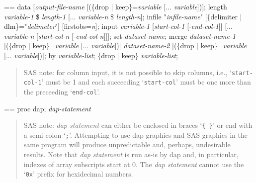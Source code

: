 \documentclass{book}
\makeatletter
\newcommand\Texinfocommandstyletextvar[1]{{\normalfont{}\textsl{#1}}}%
\newenvironment{Texinfopreformatted}{%
  \par\GNUTobeylines\obeyspaces\frenchspacing\parskip=\z@\parindent=\z@}{}
{\catcode`\^^M=13 \gdef\GNUTobeylines{\catcode`\^^M=13 \def^^M{\null\par}}}
\newenvironment{Texinfoindented}{\begin{list}{}{}\item\relax}{\end{list}}
\renewcommand{\_}{\Texinfounderscore\discretionary{}{}{}}
\makeatother
\begin{document}
\begin{Texinfoindented}
\begin{Texinfopreformatted}%
data [\Texinfocommandstyletextvar{output-file-name} [(\{drop | keep\}=\Texinfocommandstyletextvar{variable} [... \Texinfocommandstyletextvar{variable}])];
length \Texinfocommandstyletextvar{variable-1} \$ \Texinfocommandstyletextvar{length-1} [... \Texinfocommandstyletextvar{variable-n} \$ \Texinfocommandstyletextvar{length-n}];
infile "\Texinfocommandstyletextvar{infile-name}" [\{delimiter | dlm\}="\Texinfocommandstyletextvar{delimeter}"]
                       [firstobs=\Texinfocommandstyletextvar{n}];
input \Texinfocommandstyletextvar{variable-1} [\Texinfocommandstyletextvar{start-col-1} [-\Texinfocommandstyletextvar{end-col-1}]]
      [... \Texinfocommandstyletextvar{variable-n} [\Texinfocommandstyletextvar{start-col-n} [-\Texinfocommandstyletextvar{end-col-n}]]];
set \Texinfocommandstyletextvar{dataset-name};
merge \Texinfocommandstyletextvar{dataset-name-1} [(\{drop | keep\}=\Texinfocommandstyletextvar{variable} [... \Texinfocommandstyletextvar{variable}])]
     \Texinfocommandstyletextvar{dataset-name-2} [(\{drop | keep\}=\Texinfocommandstyletextvar{variable} [... \Texinfocommandstyletextvar{variable}])];
by \Texinfocommandstyletextvar{variable-list};
\{drop | keep\} \Texinfocommandstyletextvar{variable-list};

\end{Texinfopreformatted}
\end{Texinfoindented}

\begin{quote}
SAS note: for column input, it is not possible to skip columns, i.e.,
`\texttt{start-col-1}' must be 1 and each succeeding `\texttt{start-col}'
must be one more than the preceeding `\texttt{end-col}'.
\end{quote}

\begin{Texinfoindented}
\begin{Texinfopreformatted}%
proc dap;
\Texinfocommandstyletextvar{dap-statement}

\end{Texinfopreformatted}
\end{Texinfoindented}

\begin{quote}
SAS note: \Texinfocommandstyletextvar{dap statement} can either be enclosed in braces `\texttt{\{\ \}}' or
end with a semi-colon `\texttt{;}'. Attempting to use dap graphics and SAS graphics in the
same program will produce unpredictable and, perhaps, undesirable results. Note
that \Texinfocommandstyletextvar{dap statement} is run as-is by dap and, in particular, indexes of array
subscripts start at 0. The \Texinfocommandstyletextvar{dap statement} cannot use
the `\texttt{0x}' prefix for hexidecimal numbers.
\end{quote}
\end{document}

